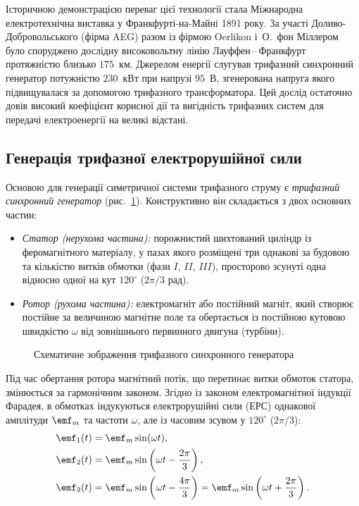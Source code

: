 Історичною демонстрацією переваг цієї технології стала Міжнародна електротехнічна виставка у Франкфурті-на-Майні 1891 року. За участі Доливо-Добровольського (фірма AEG) разом із фірмою Oerlikon і~О.~фон Міллером було споруджено дослідну високовольтну лінію Лауффен\,--\,Франкфурт протяжністю близько \( 175 \)~км. Джерелом енергії слугував трифазний синхронний генератор потужністю \( 230 \)~кВт при напрузі \( 95 \)~В, згенерована напруга якого підвищувалася за допомогою трифазного трансформатора. Цей дослід остаточно довів високий коефіцієнт корисної дії та вигідність трифазних систем для передачі електроенергії на великі відстані.

\subsection*{Генерація трифазної електрорушійної сили}

Основою для генерації симетричної системи трифазного струму є \emph{трифазний синхронний генератор} (рис.~\ref{pic:ThreePhaseGenerator}). Конструктивно він складається з двох основних частин:
\begin{itemize}
    \item \emph{Статор (нерухома частина):} порожнистий шихтований циліндр із феромагнітного матеріалу, у пазах якого розміщені три однакові за будовою та кількістю витків обмотки (фази $I$, $II$, $III$), просторово зсунуті одна відносно одної на кут $120^\circ$ ($2\pi/3$ рад).
    \item \emph{Ротор (рухома частина):} електромагніт або постійний магніт, який створює постійне за величиною магнітне поле та обертається із постійною кутовою швидкістю $\omega$ від зовнішнього первинного двигуна (турбіни).
\end{itemize}

\begin{figure}[h!]
	\centering
	\caption{Схематичне зображення трифазного синхронного генератора}
	\label{pic:ThreePhaseGenerator}
\end{figure}

Під час обертання ротора магнітний потік, що перетинає витки обмоток статора, змінюється за гармонічним законом. Згідно із законом електромагнітної індукції Фарадея, в обмотках індукуються електрорушійні сили (ЕРС) однакової амплітуди $\emf_m$ та частоти $\omega$, але із часовим зсувом у $120^\circ$ ($2\pi/3$):
\begin{align}
	\emf_1(t) &= \emf_m \sin(\omega t), \notag \\
	\emf_2(t) &= \emf_m \sin\left(\omega t - \frac{2\pi}{3}\right), \label{eq:emf_system} \\
	\emf_3(t) &= \emf_m \sin\left(\omega t - \frac{4\pi}{3}\right) = \emf_m \sin\left(\omega t + \frac{2\pi}{3}\right). \notag
\end{align}


